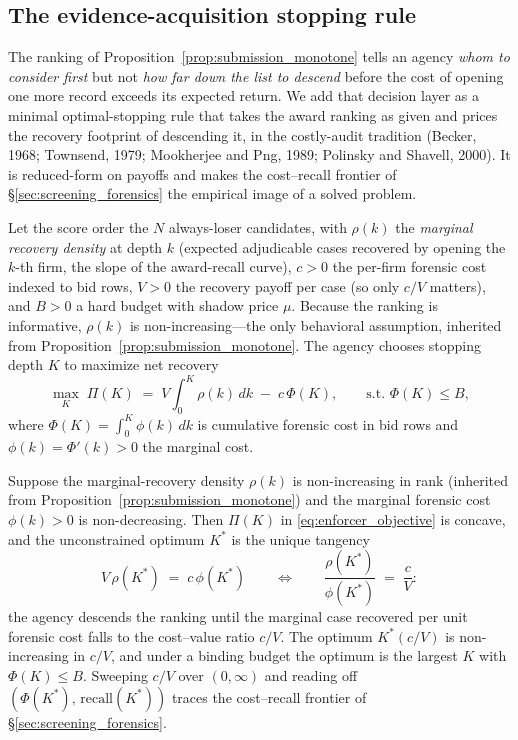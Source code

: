 \subsection{The evidence-acquisition stopping rule}
\label{app:framework_stopping}

The ranking of Proposition~\ref{prop:submission_monotone} tells an
agency \emph{whom to consider first} but not \emph{how far down the list
to descend} before the cost of opening one more record exceeds its
expected return. We add that decision layer as a minimal
optimal-stopping rule that takes the award ranking as given and prices
the recovery footprint of descending it, in the costly-audit tradition
(Becker, 1968; Townsend, 1979; Mookherjee and Png, 1989; Polinsky and
Shavell, 2000). It is reduced-form on payoffs and makes the cost--recall
frontier of \S\ref{sec:screening_forensics} the empirical image of a
solved problem.

Let the score order the $N$ always-loser candidates, with $\rho(k)$ the
\emph{marginal recovery density} at depth $k$ (expected adjudicable
cases recovered by opening the $k$-th firm, the slope of the
award-recall curve), $c>0$ the per-firm forensic cost indexed to bid
rows, $V>0$ the recovery payoff per case (so only $c/V$ matters), and
$B>0$ a hard budget with shadow price $\mu$. Because the ranking is
informative, $\rho(k)$ is non-increasing---the only behavioral
assumption, inherited from Proposition~\ref{prop:submission_monotone}.
The agency chooses stopping depth $K$ to maximize net recovery
\begin{equation}
\label{eq:enforcer_objective}
  \max_{K}\;\Pi(K)
  \;=\; V\!\int_0^{K}\!\rho(k)\,dk \;-\; c\,\Phi(K),
  \qquad \text{s.t. } \Phi(K)\le B,
\end{equation}
where $\Phi(K)=\int_0^{K}\phi(k)\,dk$ is cumulative forensic cost in bid
rows and $\phi(k)=\Phi'(k)>0$ the marginal cost.

\begin{proposition}
\label{prop:enforcer_trigger}
Suppose the marginal-recovery density $\rho(k)$ is non-increasing in rank
(inherited from Proposition~\ref{prop:submission_monotone}) and the
marginal forensic cost $\phi(k)>0$ is non-decreasing. Then $\Pi(K)$ in
\eqref{eq:enforcer_objective} is concave, and the unconstrained optimum
$K^{*}$ is the unique tangency
\begin{equation}
\label{eq:enforcer_foc}
  V\,\rho(K^{*}) \;=\; c\,\phi(K^{*})
  \qquad\Longleftrightarrow\qquad
  \frac{\rho(K^{*})}{\phi(K^{*})} \;=\; \frac{c}{V}:
\end{equation}
the agency descends the ranking until the marginal case recovered per
unit forensic cost falls to the cost--value ratio $c/V$. The optimum
$K^{*}(c/V)$ is non-increasing in $c/V$, and under a binding budget the
optimum is the largest $K$ with $\Phi(K)\le B$. Sweeping $c/V$ over
$(0,\infty)$ and reading off
$(\Phi(K^{*}),\,\mathrm{recall}(K^{*}))$ traces the cost--recall frontier
of \S\ref{sec:screening_forensics}.
\end{proposition}

